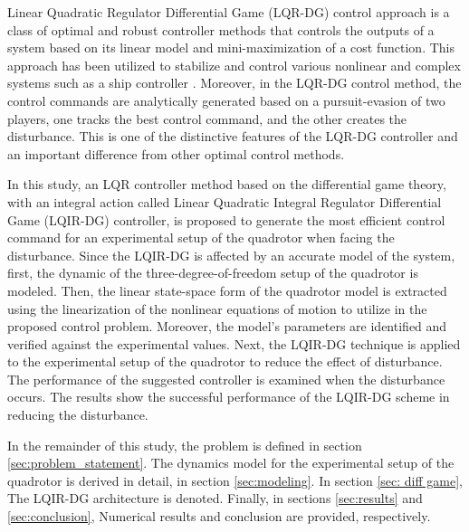 \documentclass[conference]{IEEEtran}
\begin{document}
     Linear Quadratic Regulator Differential Game (LQR-DG) control approach \cite{LQDG, robust_LQDG} is a class of optimal and robust controller methods that controls the outputs of a system based on its linear model and mini-maximization of a cost function. This approach has been utilized to stabilize and control various nonlinear and complex systems such as a ship controller \cite{LQDG_ship}. Moreover, in the LQR-DG control method, the control commands are analytically generated based on a pursuit-evasion of two players, one tracks the best control command, and the other creates the disturbance. This is one of the distinctive features of the LQR-DG controller and an important difference from other optimal control methods.


     In this study, an LQR controller method based on the differential game theory, with an integral action called Linear Quadratic Integral Regulator Differential Game (LQIR-DG) controller, is proposed to generate the most efficient control command for an experimental setup of the quadrotor when facing the disturbance. Since the LQIR-DG is affected by an accurate model of the system, first, the dynamic of the three-degree-of-freedom setup of the quadrotor is modeled. Then, the linear state-space form of the quadrotor model is extracted using the linearization of the nonlinear equations of motion to utilize in the proposed control problem. Moreover, the model's parameters are identified and verified against the experimental values. Next, the LQIR-DG technique is applied to the experimental setup of the quadrotor to reduce the effect of disturbance. The performance of the suggested controller is examined when the disturbance occurs. The results show the successful performance of the LQIR-DG scheme in reducing the disturbance.


In the remainder of this study, the problem
 is defined in section \ref{sec:problem_statement}. The dynamics model for the experimental setup of the quadrotor is derived in detail,  in section \ref{sec:modeling}. In section \ref{sec: diff game}, The LQIR-DG architecture is denoted. Finally, in sections \ref{sec:results} and \ref{sec:conclusion}, Numerical results and conclusion are provided, respectively.
\end{document}
